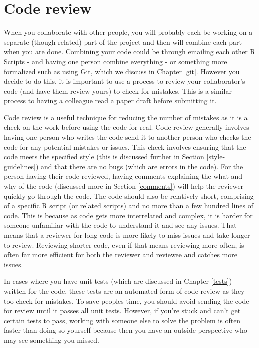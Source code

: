 \documentclass[
]{krantz}
\begin{document}
\hypertarget{code-review}{%
\section{Code review}\label{code-review}}

When you collaborate with other people, you will probably each be working on a separate (though related) part of the project and then will combine each part when you are done. Combining your code could be through emailing each other R Scripts - and having one person combine everything - or something more formalized such as using Git, which we discuss in Chapter \ref{git}. However you decide to do this, it is important to use a process to review your collaborator's code (and have them review yours) to check for mistakes. This is a similar process to having a colleague read a paper draft before submitting it.

Code review is a useful technique for reducing the number of mistakes as it is a check on the work before using the code for real. Code review generally involves having one person who writes the code send it to another person who checks the code for any potential mistakes or issues. This check involves ensuring that the code meets the specified style (this is discussed further in Section \ref{style-guidelines}) and that there are no bugs (which are errors in the code). For the person having their code reviewed, having comments explaining the what and why of the code (discussed more in Section \ref{comments}) will help the reviewer quickly go through the code. The code should also be relatively short, comprising of a specific R script (or related scripts) and no more than a few hundred lines of code. This is because as code gets more interrelated and complex, it is harder for someone unfamiliar with the code to understand it and see any issues. That means that a reviewer for long code is more likely to miss issues and take longer to review. Reviewing shorter code, even if that means reviewing more often, is often far more efficient for both the reviewer and reviewee and catches more issues.

In cases where you have unit tests (which are discussed in Chapter \ref{tests}) written for the code, these tests are an automated form of code review as they too check for mistakes. To save peoples time, you should avoid sending the code for review until it passes all unit tests. However, if you're stuck and can't get certain tests to pass, working with someone else to solve the problem is often faster than doing so yourself because then you have an outside perspective who may see something you missed.
\end{document}
